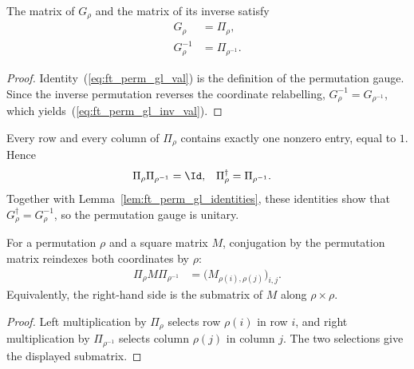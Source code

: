 \begin{lemma}
    \label{lem:ft_perm_gl_identities}
    \leanok
    The matrix of $G_\rho$ and the matrix of its inverse satisfy
    \begin{align}
        G_\rho
         & = \Pi_\rho, \label{eq:ft_perm_gl_val}            \\
        G_\rho^{-1}
         & = \Pi_{\rho^{-1}}. \label{eq:ft_perm_gl_inv_val}
    \end{align}
\end{lemma}

\begin{proof}\leanok
    Identity~(\ref{eq:ft_perm_gl_val}) is the definition of the permutation gauge.
    Since the inverse permutation reverses the coordinate relabelling,
    $G_\rho^{-1}=G_{\rho^{-1}}$, which yields~(\ref{eq:ft_perm_gl_inv_val}).
\end{proof}

Every row and every column of $\Pi_\rho$ contains exactly one nonzero entry,
equal to $1$. Hence
\begin{align}
    \Pi_\rho\Pi_{\rho^{-1}}
     & =\Id,
     &
    \Pi_\rho^\dagger
     & =\Pi_{\rho^{-1}}.
    \notag
\end{align}
Together with Lemma~\ref{lem:ft_perm_gl_identities}, these identities show that
$G_\rho^\dagger=G_\rho^{-1}$, so the permutation gauge is unitary.

\begin{lemma}
    \label{lem:ft_perm_matrix_conj_submatrix}
    \leanok
    For a permutation $\rho$ and a square matrix $M$, conjugation by the
    permutation matrix reindexes both coordinates by $\rho$:
    \begin{align}
        \Pi_\rho M\Pi_{\rho^{-1}}
         & =\bigl(M_{\rho(i),\rho(j)}\bigr)_{i,j}.
        \label{eq:app_ft_perm_conjugation}
    \end{align}
    Equivalently, the right-hand side is the submatrix of $M$ along
    $\rho\times\rho$.
\end{lemma}

\begin{proof}
    \leanok
    Left multiplication by $\Pi_\rho$ selects row $\rho(i)$ in row $i$, and
    right multiplication by $\Pi_{\rho^{-1}}$ selects column $\rho(j)$ in
    column $j$. The two selections give the displayed submatrix.
\end{proof}

